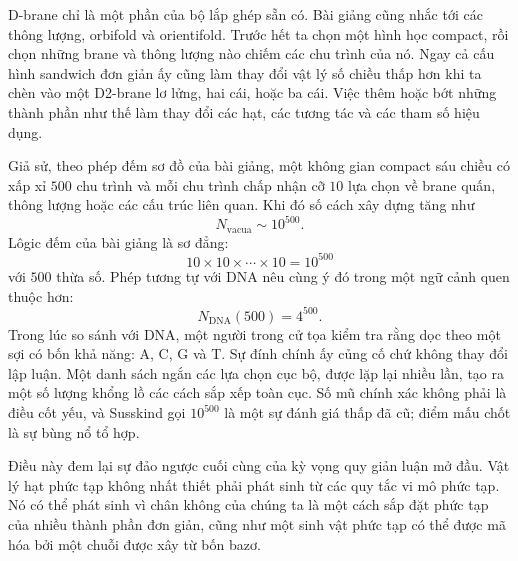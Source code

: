 D-brane chỉ là một phần của bộ lắp ghép sẵn có. Bài giảng cũng nhắc tới các thông lượng, orbifold và orientifold. Trước hết ta chọn một hình học compact, rồi chọn những brane và thông lượng nào chiếm các chu trình của nó. Ngay cả cấu hình sandwich đơn giản ấy cũng làm thay đổi vật lý số chiều thấp hơn khi ta chèn vào một D2-brane lơ lửng, hai cái, hoặc ba cái. Việc thêm hoặc bớt những thành phần như thế làm thay đổi các hạt, các tương tác và các tham số hiệu dụng.

Giả sử, theo phép đếm sơ đồ của bài giảng, một không gian compact sáu chiều có xấp xỉ \(500\) chu trình và mỗi chu trình chấp nhận cỡ \(10\) lựa chọn về brane quấn, thông lượng hoặc các cấu trúc liên quan. Khi đó số cách xây dựng tăng như
\begin{equation}
N_{\mathrm{vacua}} \sim 10^{500}.
\end{equation}
Lôgic đếm của bài giảng là sơ đẳng:
\begin{equation}
10 \times 10 \times \cdots \times 10 = 10^{500}
\end{equation}
với \(500\) thừa số. Phép tương tự với DNA nêu cùng ý đó trong một ngữ cảnh quen thuộc hơn:
\begin{equation}
N_{\mathrm{DNA}}(500)=4^{500}.
\end{equation}
Trong lúc so sánh với DNA, một người trong cử tọa kiểm tra rằng dọc theo một sợi có bốn khả năng: A, C, G và T. Sự đính chính ấy củng cố chứ không thay đổi lập luận. Một danh sách ngắn các lựa chọn cục bộ, được lặp lại nhiều lần, tạo ra một số lượng khổng lồ các cách sắp xếp toàn cục. Số mũ chính xác không phải là điều cốt yếu, và Susskind gọi \(10^{500}\) là một sự đánh giá thấp đã cũ; điểm mấu chốt là sự bùng nổ tổ hợp.

Điều này đem lại sự đảo ngược cuối cùng của kỳ vọng quy giản luận mở đầu. Vật lý hạt phức tạp không nhất thiết phải phát sinh từ các quy tắc vi mô phức tạp. Nó có thể phát sinh vì chân không của chúng ta là một cách sắp đặt phức tạp của nhiều thành phần đơn giản, cũng như một sinh vật phức tạp có thể được mã hóa bởi một chuỗi được xây từ bốn bazơ.

\begin{classroomqa}
\end{classroomqa}

